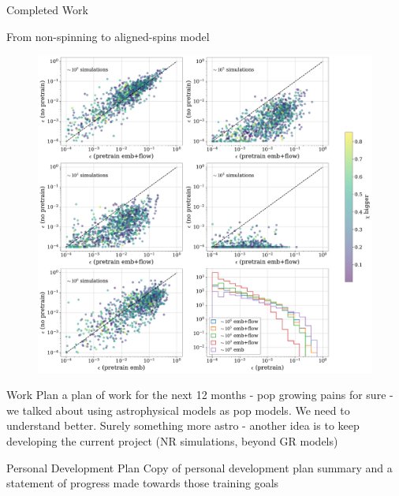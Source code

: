 \documentclass[a4paper, 12pt, twoside, openright, titlepage]{book}
\begin{document}
\begin{chapter}{Completed Work}
\begin{section}{From non-spinning to aligned-spins model}
\begin{figure}
\includegraphics[width=1.1\columnwidth]{figures/neff.pdf}
\caption{}
\label{eff}
\end{figure}







\end{section}



\end{chapter}

\begin{chapter}{Work Plan}
a plan of work for the next 12 months
- pop growing pains for sure
- we talked about using astrophysical models as pop models. We need to understand better. Surely something more astro
- another idea is to keep developing the current project (NR simulations, beyond GR models)
\end{chapter}

\begin{chapter}{Personal Development Plan}
Copy of personal development plan summary and a statement of progress made towards those training goals
\end{chapter}

\appendix
%
%
%

\backmatter

\end{document}
